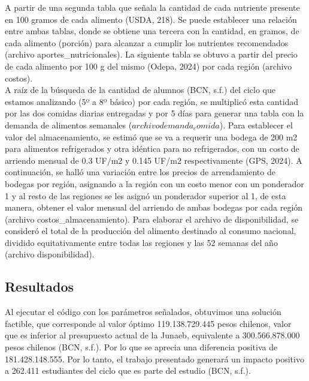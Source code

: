 \documentclass[letterpaper]{article}
\begin{document}
    A partir de una segunda tabla que señala la cantidad de cada nutriente presente en 100 gramos de cada alimento (USDA, 218). Se puede establecer una relación entre ambas tablas, donde se obtiene una tercera con la cantidad, en gramos, de cada alimento (porción) para alcanzar a cumplir los nutrientes recomendados (archivo aportes\_nutricionales). La siguiente tabla se obtuvo a partir del precio de cada alimento por 100 g del mismo (Odepa, 2024) por cada región (archivo costos).
    \\
    
    A raíz de la búsqueda de la cantidad de alumnos (BCN, s.f.) del ciclo que estamos analizando (5º a 8º básico) por cada región, se multiplicó esta cantidad por las dos comidas diarias entregadas y por 5 días para generar una tabla con la demanda de alimentos semanales ($archivo demanda_comida$).
    Para establecer el valor del almacenamiento, se estimó que se va a requerir una bodega de 200 m2 para alimentos refrigerados y otra idéntica para no refrigerados, con un costo de arriendo  mensual de 0.3 UF/m2 y 0.145 UF/m2 respectivamente (GPS, 2024).  A continuación, se halló una variación entre los precios de arrendamiento de bodegas por región, asignando a la región con un costo menor con un ponderador 1 y al resto de las regiones se les asignó un ponderador superior al 1, de esta manera, obtener el valor mensual del arriendo de ambas bodegas por cada región (archivo costos\_almacenamiento).
    Para elaborar el archivo de disponibilidad, se consideró el total de la producción del alimento destinado al consumo nacional, dividido equitativamente entre todas las regiones y las 52 semanas del año (archivo disponibilidad).

    \subsection{Resultados}
    Al ejecutar el código con los parámetros señalados, obtuvimos una solución factible, que corresponde al valor óptimo 119.138.729.445 pesos chilenos, valor que es inferior al presupuesto actual de la Junaeb, equivalente a 300.566.878.000 pesos chilenos (BCN, s.f.). Por lo que se aprecia una diferencia positiva de 181.428.148.555. Por lo tanto, el trabajo presentado generará un impacto positivo a 262.411 estudiantes del ciclo que es parte del estudio (BCN, s.f.).
\end{document}
